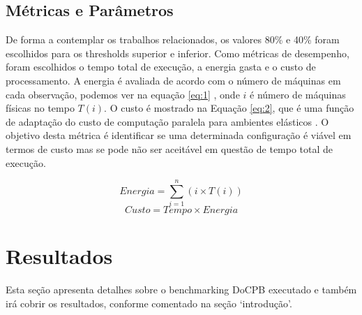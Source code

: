 \documentclass[twoside,english,brazilian]{UNISINOSartigo}
\begin{document}
\subsection{Métricas e Parâmetros}

De forma a contemplar os trabalhos relacionados, os valores 80\% e 40\% foram escolhidos para os thresholds superior e inferior. Como métricas de desempenho, foram escolhidos o tempo total de execução, a energia gasta e o custo de processamento. A energia é avaliada de acordo com o número de máquinas em cada observação, podemos ver na equação \ref{eq:1} , onde \(i\) é número de máquinas físicas no tempo \(T(i)\).  O custo é mostrado na Equação \ref{eq:2}, que é uma função de adaptação do custo de computação paralela para ambientes elásticos \cite{Barry2004}. O objetivo desta métrica é identificar se uma determinada configuração é viável em termos de custo mas se pode não ser aceitável em questão de tempo total de execução. 

\begin{equation}
\label{eq:1}
Energia = \sum_{i=1}^{n}{(i \times T(i))}
\end{equation}
\begin{equation}
\label{eq:2}
Custo = Tempo \times Energia
\end{equation}

\section{Resultados}
\label{avaliacao}

Esta seção apresenta detalhes sobre o benchmarking DoCPB executado e também irá cobrir os resultados, conforme comentado na seção `introdução'. 
\end{document}
